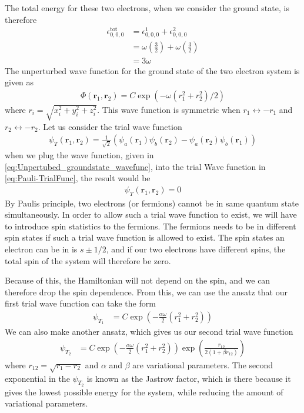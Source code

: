 \documentclass[12pt]{article}
\begin{document}
The total energy for these two electrons, when we consider the ground state, is therefore
\begin{align*}
\epsilon_{0,0,0}^{\text{tot}} &= \epsilon_{0,0,0}^1 + \epsilon_{0,0,0}^2 \\
&= \omega\left(\frac{3}{2} \right) + \omega\left(\frac{3}{2} \right)\\
&= 3\omega
\end{align*}
The unperturbed wave function for the ground state of the two electron system is given as
\begin{align}
\Phi (\mathbf{r}_1, \mathbf{r}_2) = C\exp(-\omega(r_1^2 + r_2^2)/2)
\label{eq:Unpertubed_groundstate_wavefunc}
\end{align}
where $r_i = \sqrt{x_i^2 + y_i^2 + z_i^2}$. This wave function is symmetric when $r_1 \leftrightarrow -r_1$ and $r_2 \leftrightarrow -r_2$. Let us consider the trial wave function
\begin{align}
\psi_T(\mathbf{r}_1, \mathbf{r}_2) = \frac{1}{\sqrt{2}}\left(\psi_a(\mathbf{r}_1)\psi_b(\mathbf{r}_2)- \psi_a(\mathbf{r}_2)\psi_b(\mathbf{r}_1)  \right) 
\label{eq:Pauli-TrialFunc}
\end{align}
when we plug the wave function, given in \ref{eq:Unpertubed_groundstate_wavefunc}, into the trial Wave function in \ref{eq:Pauli-TrialFunc}, the result would be
\begin{align*}
\psi_T(\mathbf{r}_1, \mathbf{r}_2) = 0
\end{align*}
By Paulis principle, two electrons (or fermions) cannot be in same quantum state simultaneously. In order to allow such a trial wave function to exist, we will have to introduce spin statistics to the fermions. The fermions needs to be in different spin states if such a trial wave function is allowed to exist. The spin states an electron can be in is $s\pm 1/2$, and if our two electrons have different spins, the total spin of the system will therefore be zero.

Because of this, the Hamiltonian will not depend on the spin, and we can therefore drop the spin dependence. From this, we can use the ansatz that our first trial wave function can take the form 
\begin{align}
\psi_{T_1} &= C \exp\left(-\frac{\alpha \omega}{2}(r^2_1 + r^2_2)\right)
\label{eq:First_TrialFunc}
\end{align}
We can also make another ansatz, which gives us our second trial wave function
\begin{align}
\psi_{T_2} &= C \exp\left(-\frac{\alpha \omega}{2}(r^2_1 + r^2_2)\right)\exp\left(\frac{r_{12}}{2(1+\beta r_{12})}\right)
\label{eq:Second_TrialFunc}
\end{align}
where $r_{12} = \sqrt{r_1 - r_2}$ and $\alpha$ and $\beta$ are variational parameters. The second exponential in the $\psi_{T_2}$ is known as the Jastrow factor, which is there because it gives the lowest possible energy for the system, while reducing the amount of variational parameters.
\end{document}
